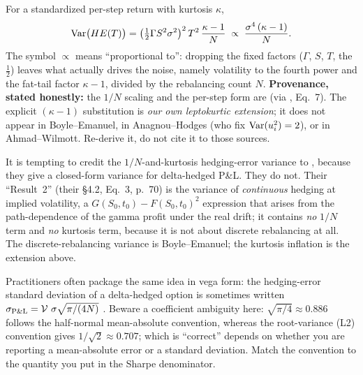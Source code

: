 \begin{keyresult}
For a standardized per-step return with kurtosis $\kappa$,
\begin{equation}
\label{eq:ivrv:kappa-inflation}
\operatorname{Var}\!\big(HE(T)\big) = \big(\tfrac{1}{2}\Gamma S^2\sigma^2\big)^2\, T^2\,\frac{\kappa - 1}{N}
\;\propto\; \frac{\sigma^4\,(\kappa - 1)}{N}.
\end{equation}
The symbol $\propto$ means ``proportional to'': dropping the fixed factors ($\Gamma$, $S$, $T$, the $\tfrac12$) leaves what actually drives the noise, namely volatility to the fourth power and the fat-tail factor $\kappa-1$, divided by the rebalancing count $N$. \textbf{Provenance, stated honestly:} the $1/N$ scaling and the per-step form are \citet{BoyleEmanuel1980} (via \citealp{AnagnouHodges2007}, Eq.~7). The explicit $(\kappa-1)$ substitution is \emph{our own leptokurtic extension}; it does not appear in Boyle--Emanuel, in Anagnou--Hodges (who fix $\operatorname{Var}(u_i^2)=2$), or in Ahmad--Wilmott. Re-derive it, do not cite it to those sources.
\end{keyresult}

\begin{warning}
It is tempting to credit the $1/N$-and-kurtosis hedging-error variance to \citet{AhmadWilmott2005}, because they give a closed-form variance for delta-hedged P\&L. They do not. Their ``Result~2'' (their \S4.2, Eq.~3, p.~70) is the variance of \emph{continuous} hedging at implied volatility, a $G(S_0,t_0) - F(S_0,t_0)^2$ expression that arises from the path-dependence of the gamma profit under the real drift; it contains \emph{no} $1/N$ term and \emph{no} kurtosis term, because it is not about discrete rebalancing at all. The discrete-rebalancing variance is Boyle--Emanuel; the kurtosis inflation is the extension above.
\end{warning}

Practitioners often package the same idea in vega form: the hedging-error standard deviation of a delta-hedged option is sometimes written $\sigma_{\text{P\&L}} = \operatorname{\mathcal{V}}\,\sigma\sqrt{\pi/(4N)}$ \citep[][context only]{Bennett2014}. Beware a coefficient ambiguity here: $\sqrt{\pi/4} \approx 0.886$ follows the half-normal mean-absolute convention, whereas the root-variance (L2) convention gives $1/\sqrt{2} \approx 0.707$; which is ``correct'' depends on whether you are reporting a mean-absolute error or a standard deviation. Match the convention to the quantity you put in the Sharpe denominator.

